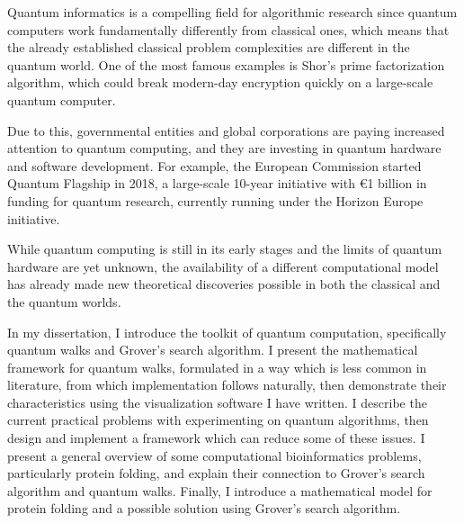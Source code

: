 Quantum informatics is a compelling field for algorithmic research since quantum computers work fundamentally differently from classical ones, which means that the already established classical problem complexities are different in the quantum world. One of the most famous examples is Shor's prime factorization algorithm, which could break modern-day encryption quickly on a large-scale quantum computer.

Due to this, governmental entities and global corporations are paying increased attention to quantum computing, and they are investing in quantum hardware and software development. For example, the European Commission started Quantum Flagship in 2018, a large-scale 10-year initiative with €1 billion in funding for quantum research, currently running under the Horizon Europe initiative.

While quantum computing is still in its early stages and the limits of quantum hardware are yet unknown, the availability of a different computational model has already made new theoretical discoveries possible in both the classical and the quantum worlds.


In my dissertation, I introduce the toolkit of quantum computation, specifically quantum walks and Grover's search algorithm. I present the mathematical framework for quantum walks, formulated in a way which is less common in literature, from which implementation follows naturally, then demonstrate their characteristics using the visualization software I have written. I describe the current practical problems with experimenting on quantum algorithms, then design and implement a framework which can reduce some of these issues. I present a general overview of some computational bioinformatics problems, particularly protein folding, and explain their connection to Grover's search algorithm and quantum walks. Finally, I introduce a mathematical model for protein folding and a possible solution using Grover's search algorithm.

\vfill
\selectthesislanguage

\setcounter{romanPage}{\value{page}}
